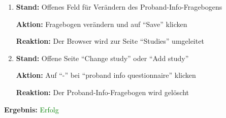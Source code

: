 \documentclass[a4paper]{scrreprt}
\begin{document}
\begin{itemize}
\begin{enumerate}
		                              \item \par \textbf{Stand: }Offenes Feld f\"ur Ver\"andern des Proband-Info-Fragebogens
		                                    \par \textbf{Aktion: }Fragebogen ver\"andern und auf ``Save'' klicken
		                                    \par \textbf{Reaktion: }Der Browser wird zur Seite ``Studies'' umgeleitet
		                              \item \par \textbf{Stand: }Offene Seite ``Change study'' oder ``Add study''
		                                    \par \textbf{Aktion: }Auf ``-'' bei ``proband info questionnaire'' klicken
		                                    \par \textbf{Reaktion: }Der Proband-Info-Fragebogen wird gel\"oscht
		                          \end{enumerate}
		      					\vspace*{0.3cm}
		      		           \par \textbf{Ergebnis: }\textcolor{green}{Erfolg}
		      		           \vspace*{0.6cm}  	
		      		

\end{itemize}
\end{document}
